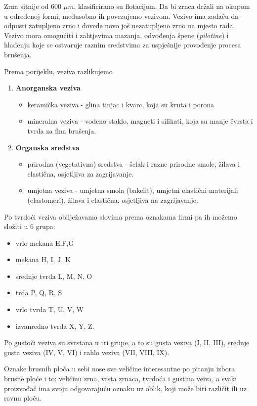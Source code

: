 \documentclass[a4paper,12pt]{article}
\numberwithin{figure}{section}
\begin{document}
Zrna sitnije od 600 $\mu m$, klasificirano su flotacijom. Da bi zrnca držali na okupom u određenoj formi, međusobno ih povezujemo vezivom. Vezivo ima zadaću da odpusti zatupljeno zrno i dovede novo još nezatupljeno zrno na mjesto rada. Vezivo mora omogućiti i zahtjevima mazanja, odvođenja špene (\textit{pilotine}) i hlađenju koje se ostvaruje raznim sredstvima za uspješnije provođenje procesa brušenja. \par
Prema porijeklu, veziva razlikujemo 
\begin{enumerate}
\item \textbf{Anorganska veziva}
\begin{itemize}
\item keramička veziva - glina tinjac i kvarc, koja su kruta i porona
\item mineralna veziva - vodeno staklo, magneti i silikati, koja su manje čvrsta i tvrđa za fina brušenja.
\end{itemize}
\item \textbf{Organska sredstva}
\begin{itemize}
\item prirodna (vegetativna) sredstva - šelak i razne prirodne smole, žilava i elastična, osjetljiva za zagrijavanje.
\item umjetna veziva - umjetna smola (bakelit), umjetni elastični materijali (elastomeri), žilava i elastična, osjetljiva na zagrijavanje.
\end{itemize}
\end{enumerate}
Po tvrdoći veziva obilježavamo slovima prema oznakama firmi pa ih možemo složiti u 6 grupa:
\begin{itemize}
\item vrlo mekana E,F,G
\item mekana H, I, J, K
\item srednje tvrđa L, M, N, O
\item trda P, Q, R, S
\item vrlo tvrda T, U, V, W
\item izvanredno tvrda X, Y, Z.
\end{itemize}
Po gustoči veziva su svrstana u tri grupe, a to su gusta veziva  (I, II, III), srednje gusta veziva (IV, V, VI) i rahlo veziva (VII, VIII, IX).\par
Oznake brusnih ploča u sebi nose sve veličine interesantne po pitanju izbora brusne ploće i to: veličinu zrna, vrsta zrnaca, tvrdoća i gustina veiva, a svaki proizvođač ima svoju odgovarajuću oznaku uz oblik, koji može biti različit ili uz ravnu ploču.
\end{document}

